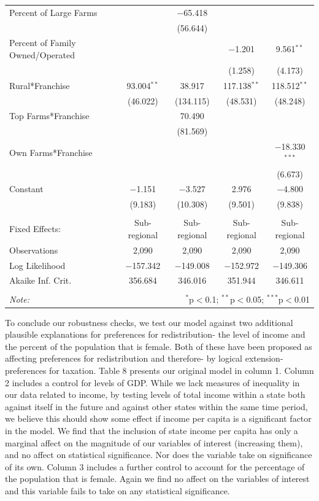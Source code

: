 \documentclass[letter, 12pt]{article}
\begin{document}
\begin{table}[!htbp]
\begin{tabular}{@{\extracolsep{5pt}}lcccc}
		Percent of Large Farms &  & $-$65.418 &  &  \\ 
		&  & (56.644) &  &  \\ 
		Percent of Family
		Owned/Operated &  &  & $-$1.201 & 9.561$^{**}$ \\ 
		&  &  & (1.258) & (4.173) \\ 
		Rural*Franchise & 93.004$^{**}$ & 38.917 & 117.138$^{**}$ & 118.512$^{**}$ \\ 
		& (46.022) & (134.115) & (48.531) & (48.248) \\ 
		Top Farms*Franchise &  & 70.490 &  &  \\ 
		&  & (81.569) &  &  \\ 
		Own Farms*Franchise &  &  &  & $-$18.330$^{***}$ \\ 
		&  &  &  & (6.673) \\ 
		Constant & $-$1.151 & $-$3.527 & 2.976 & $-$4.800 \\ 
		& (9.183) & (10.308) & (9.501) & (9.838) \\ 
		\hline \\[-1.8ex] 
		Fixed Effects: & Sub-regional & Sub-regional & Sub-regional & Sub-regional \\ 
		Observations & 2,090 & 2,090 & 2,090 & 2,090 \\ 
		Log Likelihood & $-$157.342 & $-$149.008 & $-$152.972 & $-$149.306 \\ 
		Akaike Inf. Crit. & 356.684 & 346.016 & 351.944 & 346.611 \\ 
		\hline 
		\hline \\[-1.8ex] 
		\textit{Note:}  & \multicolumn{4}{r}{$^{*}$p$<$0.1; $^{**}$p$<$0.05; $^{***}$p$<$0.01} \\ 
	\end{tabular} 
\end{table} 
 
 To conclude our robustness checks, we test our model against two additional plausible explanations for preferences for redistribution- the level of income and the percent of the population that is female. Both of these have been proposed as affecting preferences for redistribution and therefore- by logical extension- preferences for taxation. Table 8 presents our original model in column 1. Column 2 includes a control for levels of GDP. While we lack measures of inequality in our data related to income, by testing levels of total income within a state both against itself in the future and against other states within the same time period, we believe this should show some effect if income per capita is a significant factor in the model. We find that the inclusion of state income per capita has only a marginal affect on the magnitude of our variables of interest (increasing them), and no affect on statistical significance. Nor does the variable take on significance of its own. Column 3 includes a further control to account for the percentage of the population that is female. Again we find no affect on the variables of interest and this variable fails to take on any statistical significance.
 
\end{document}
